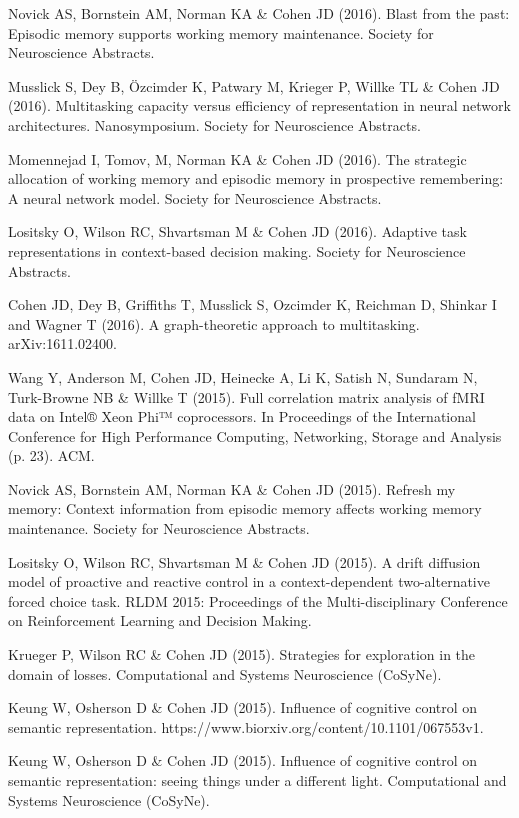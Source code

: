 \documentclass[10 pt]{article}
\begin{document}
Novick AS, Bornstein AM, Norman KA \& Cohen JD (2016). Blast from the past: Episodic memory supports working memory maintenance. Society for Neuroscience Abstracts.

Musslick S, Dey B, Özcimder K, Patwary M, Krieger P, Willke TL \& Cohen JD (2016). Multitasking capacity versus efficiency of representation in neural network architectures. Nanosymposium. Society for Neuroscience Abstracts.

Momennejad I, Tomov, M, Norman KA \& Cohen JD (2016). The strategic allocation of working memory and episodic memory in prospective remembering: A neural network model. Society for Neuroscience Abstracts.

Lositsky O, Wilson RC, Shvartsman M \& Cohen JD (2016). Adaptive task representations in context-based decision making. Society for Neuroscience Abstracts.

Cohen JD, Dey B, Griffiths T, Musslick S, Ozcimder K, Reichman D, Shinkar I and Wagner T (2016). A graph-theoretic approach to multitasking. arXiv:1611.02400.

Wang Y, Anderson M, Cohen JD, Heinecke A, Li K, Satish N, Sundaram N, Turk-Browne NB \& Willke T (2015). Full correlation matrix analysis of fMRI data on Intel® Xeon Phi™ coprocessors. In Proceedings of the International Conference for High Performance Computing, Networking, Storage and Analysis (p. 23). ACM.

Novick AS, Bornstein AM, Norman KA \& Cohen JD (2015). Refresh my memory: Context information from episodic memory affects working memory maintenance. Society for Neuroscience Abstracts.

Lositsky O, Wilson RC, Shvartsman M \& Cohen JD (2015). A drift diffusion model of proactive and reactive control in a context-dependent two-alternative forced choice task. RLDM 2015: Proceedings of the Multi-disciplinary Conference on Reinforcement Learning and Decision Making.

Krueger P, Wilson RC \& Cohen JD (2015). Strategies for exploration in the domain of losses. Computational and Systems Neuroscience (CoSyNe).

Keung W, Osherson D \& Cohen JD (2015). Influence of cognitive control on semantic representation. https://www.biorxiv.org/content/10.1101/067553v1.

Keung W, Osherson D \& Cohen JD (2015). Influence of cognitive control on semantic representation: seeing things under a different light. Computational and Systems Neuroscience (CoSyNe).
\end{document}
